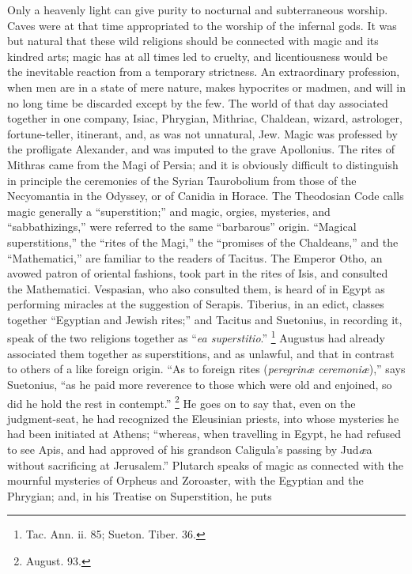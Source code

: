 Only a heavenly light can give purity to nocturnal and
subterraneous worship. Caves were at that time
appropriated to the worship of the infernal gods. It was
but natural that these wild religions should be connected
with magic and its kindred arts; magic has at all times
led to cruelty, and licentiousness would be the
inevitable reaction from a temporary strictness. An
extraordinary profession, when men are in a state of mere
nature, makes hypocrites or madmen, and will in no long
time be discarded except by the few. The world of that
day associated together in one company, Isiac, Phrygian,
Mithriac, Chaldean, wizard, astrologer, fortune-teller,
itinerant, and, as was not unnatural, Jew. Magic was
professed by the profligate Alexander, and was imputed to
the grave Apollonius. The rites of Mithras came from the
Magi of Persia; and it is obviously difficult to
distinguish in principle the ceremonies of the Syrian
Taurobolium from those of the Necyomantia in the Odyssey,
or of Canidia in Horace. The Theodosian Code calls magic
generally a ``superstition;'' and magic, orgies,
mysteries, and ``sabbathizings,'' were referred
to the same ``barbarous'' origin. ``Magical
superstitions,'' the ``rites of the Magi,''
the ``promises of the Chaldeans,'' and the
``Mathematici,'' are familiar to the readers of
Tacitus. The Emperor Otho, an avowed patron of oriental
fashions, took part in the rites of Isis, and consulted
the Mathematici. Vespasian, who also consulted them, is
heard of in Egypt as performing miracles at the
suggestion of Serapis. Tiberius, in an edict, classes
together ``Egyptian and Jewish rites;'' and
Tacitus and Suetonius, in recording it, speak of the two
religions together as ``\emph{ea superstitio}.'' \footnote{Tac. Ann. ii. 85; Sueton.
Tiber. 36.} Augustus
had already associated them together as superstitions,
and as unlawful, and that in contrast to others of a like
foreign origin. ``As to foreign rites (\emph{peregrinæ ceremoniæ}),'' says Suetonius, ``as he paid
more reverence to those which were old and enjoined, so
did he hold the rest in contempt.'' \footnote{August. 93.} He goes
on to say that, even on the judgment-seat, he had
recognized the Eleusinian priests, into whose mysteries
he had been initiated at Athens; ``whereas, when
travelling in Egypt, he had refused to see Apis, and had
approved of his grandson Caligula's passing by Jud\emph{æ}a
without sacrificing at Jerusalem.'' Plutarch speaks
of magic as connected with the mournful mysteries of
Orpheus and Zoroaster, with the Egyptian and the
Phrygian; and, in his Treatise on Superstition, he puts
